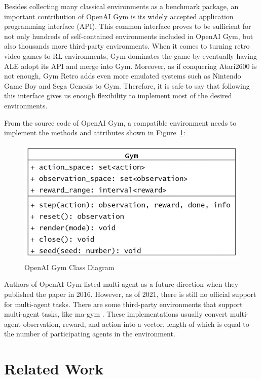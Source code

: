 Besides collecting many classical environments as a benchmark package, an important contribution of OpenAI Gym is its widely accepted application programming interface (API). This common interface proves to be sufficient for not only hundreds of self-contained environments included in OpenAI Gym, but also thousands more third-party environments. When it comes to turning retro video games to RL environments, Gym dominates the game by eventually having ALE adopt its API and merge into Gym. Moreover, as if conquering Atari2600 is not enough, Gym Retro \cite{gym-retro} adds even more emulated systems such as Nintendo Game Boy and Sega Genesis to Gym. Therefore, it is safe to say that following this interface gives us enough flexibility to implement most of the desired environments.

From the source code of OpenAI Gym, a compatible environment needs to implement the methods and attributes shown in Figure~\ref{fig:gym-class}:

\begin{figure}[htp]
    \centering
    \includegraphics{images/gym-class.png}
    \caption{OpenAI Gym Class Diagram}
    \label{fig:gym-class}
\end{figure}

Authors of OpenAI Gym listed multi-agent as a future direction when they published the paper in 2016. However, as of 2021, there is still no official support for multi-agent tasks. There are some third-party environments that support multi-agent tasks, like ma-gym \cite{magym}. These implementations usually convert multi-agent observation, reward, and action into a vector, length of which is equal to the number of participating agents in the environment.

\section{Related Work}


